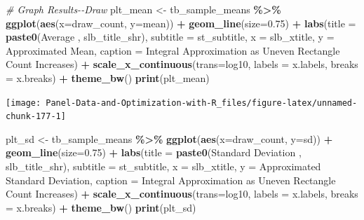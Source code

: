 \documentclass[
]{book}
\newenvironment{Shaded}{\begin{snugshade}}{\end{snugshade}}
\newcommand{\CommentTok}[1]{\textcolor[rgb]{0.56,0.35,0.01}{\textit{#1}}}
\newcommand{\DataTypeTok}[1]{\textcolor[rgb]{0.13,0.29,0.53}{#1}}
\newcommand{\FloatTok}[1]{\textcolor[rgb]{0.00,0.00,0.81}{#1}}
\newcommand{\KeywordTok}[1]{\textcolor[rgb]{0.13,0.29,0.53}{\textbf{#1}}}
\newcommand{\NormalTok}[1]{#1}
\newcommand{\OperatorTok}[1]{\textcolor[rgb]{0.81,0.36,0.00}{\textbf{#1}}}
\newcommand{\StringTok}[1]{\textcolor[rgb]{0.31,0.60,0.02}{#1}}
\begin{document}
\begin{Shaded}
\begin{Highlighting}[]
\CommentTok{\# Graph Results{-}{-}Draw}
\NormalTok{plt\_mean \textless{}{-}}\StringTok{ }\NormalTok{tb\_sample\_means }\OperatorTok{\%\textgreater{}\%}
\StringTok{  }\KeywordTok{ggplot}\NormalTok{(}\KeywordTok{aes}\NormalTok{(}\DataTypeTok{x=}\NormalTok{draw\_count, }\DataTypeTok{y=}\NormalTok{mean)) }\OperatorTok{+}
\StringTok{  }\KeywordTok{geom\_line}\NormalTok{(}\DataTypeTok{size=}\FloatTok{0.75}\NormalTok{) }\OperatorTok{+}
\StringTok{  }\KeywordTok{labs}\NormalTok{(}\DataTypeTok{title =} \KeywordTok{paste0}\NormalTok{(}\StringTok{\textquotesingle{}Average \textquotesingle{}}\NormalTok{, slb\_title\_shr),}
       \DataTypeTok{subtitle =}\NormalTok{ st\_subtitle,}
       \DataTypeTok{x =}\NormalTok{ slb\_xtitle,}
       \DataTypeTok{y =} \StringTok{\textquotesingle{}Approximated Mean\textquotesingle{}}\NormalTok{,}
       \DataTypeTok{caption =} \StringTok{\textquotesingle{}Integral Approximation as Uneven Rectangle Count Increases\textquotesingle{}}\NormalTok{) }\OperatorTok{+}
\StringTok{  }\KeywordTok{scale\_x\_continuous}\NormalTok{(}\DataTypeTok{trans=}\StringTok{\textquotesingle{}log10\textquotesingle{}}\NormalTok{, }\DataTypeTok{labels =}\NormalTok{ x.labels, }\DataTypeTok{breaks =}\NormalTok{ x.breaks) }\OperatorTok{+}
\StringTok{  }\KeywordTok{theme\_bw}\NormalTok{()}
\KeywordTok{print}\NormalTok{(plt\_mean)}
\end{Highlighting}
\end{Shaded}

\begin{center}\texttt{[image: Panel-Data-and-Optimization-with-R\_files/figure-latex/unnamed-chunk-177-1]} \end{center}

\begin{Shaded}
\begin{Highlighting}[]
\NormalTok{plt\_sd \textless{}{-}}\StringTok{ }\NormalTok{tb\_sample\_means }\OperatorTok{\%\textgreater{}\%}
\StringTok{  }\KeywordTok{ggplot}\NormalTok{(}\KeywordTok{aes}\NormalTok{(}\DataTypeTok{x=}\NormalTok{draw\_count, }\DataTypeTok{y=}\NormalTok{sd)) }\OperatorTok{+}
\StringTok{  }\KeywordTok{geom\_line}\NormalTok{(}\DataTypeTok{size=}\FloatTok{0.75}\NormalTok{) }\OperatorTok{+}
\StringTok{  }\KeywordTok{labs}\NormalTok{(}\DataTypeTok{title =} \KeywordTok{paste0}\NormalTok{(}\StringTok{\textquotesingle{}Standard Deviation \textquotesingle{}}\NormalTok{, slb\_title\_shr),}
       \DataTypeTok{subtitle =}\NormalTok{ st\_subtitle,}
       \DataTypeTok{x =}\NormalTok{ slb\_xtitle,}
       \DataTypeTok{y =} \StringTok{\textquotesingle{}Approximated Standard Deviation\textquotesingle{}}\NormalTok{,}
       \DataTypeTok{caption =} \StringTok{\textquotesingle{}Integral Approximation as Uneven Rectangle Count Increases\textquotesingle{}}\NormalTok{) }\OperatorTok{+}
\StringTok{  }\KeywordTok{scale\_x\_continuous}\NormalTok{(}\DataTypeTok{trans=}\StringTok{\textquotesingle{}log10\textquotesingle{}}\NormalTok{, }\DataTypeTok{labels =}\NormalTok{ x.labels, }\DataTypeTok{breaks =}\NormalTok{ x.breaks) }\OperatorTok{+}
\StringTok{  }\KeywordTok{theme\_bw}\NormalTok{()}
\KeywordTok{print}\NormalTok{(plt\_sd)}
\end{Highlighting}
\end{Shaded}
\end{document}
